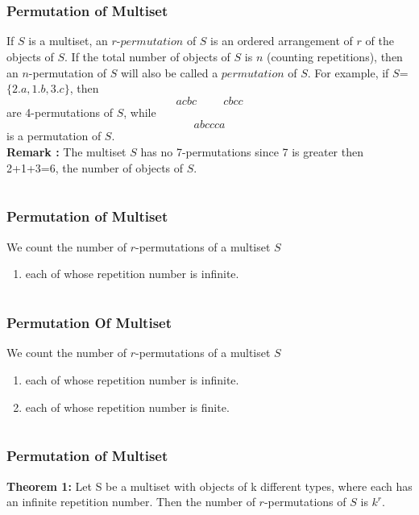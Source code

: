 \documentclass{beamer}
\begin{document}
\section{}
 \begin{frame}
\frametitle{Permutation of Multiset}
If $S$ is a multiset, an $r$-$permutation$ of $S$ is an ordered arrangement of $r$ of the objects of $S$. If the total number of objects of $S$ is $n$ (counting repetitions), then an $n$-permutation of $S$ will also be called a $permutation$ of $S$. For example, if $S$= $\{2.a, 1.b, 3.c\}$, then
       $$acbc \hspace{1cm} cbcc$$
       are 4-permutations of $S$, while
       $$abccca$$
is a permutation of $S$.\\{\bf Remark :} The multiset $S$ has no 7-permutations since 7 is greater then  2+1+3=6, the number of objects of $S$.
\end{frame}

\section{}
 \begin{frame}
\frametitle{Permutation of Multiset}
  We count the number of $r$-permutations of a multiset $S${\vspace{1cm}}
\begin{enumerate}
\item each of whose repetition number is infinite.{\vspace{1cm}}
\end{enumerate}

\end{frame}

\section{}
 \begin{frame}
\frametitle{Permutation Of Multiset}
  We count the number of $r$-permutations of a multiset $S${\vspace{1cm}}
\begin{enumerate}
\item each of whose repetition number is infinite.{\vspace{1cm}}
\item each of whose repetition number is finite.
\end{enumerate}

\end{frame}

\section{}
 \begin{frame}
\frametitle{Permutation of Multiset}
{\bf Theorem 1:} Let S be a multiset with objects of k different types, where each has an infinite repetition number. Then the number of $r$-permutations of $S$ is $k^r$.
\end{frame}
\end{document}
